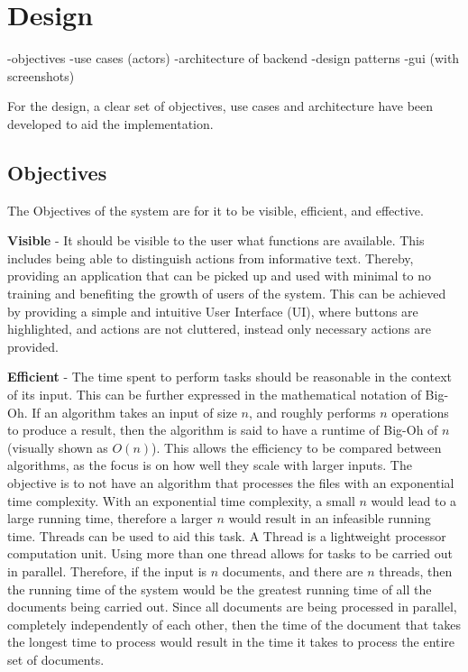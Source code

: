 \chapter{Design}
-objectives
-use cases (actors)
-architecture of backend
-design patterns
-gui (with screenshots)
\par For the design, a clear set of objectives, use cases and architecture have been developed to aid the implementation.
\section{Objectives}
\par The Objectives of the system are for it to be visible, efficient, and effective.
\par \textbf{Visible} -  It should be visible to the user what  functions are available. This includes being able to distinguish actions from informative text. Thereby, providing an application that can be picked up and used with minimal to no training and benefiting the growth of users of the system. This can be achieved by providing a simple and intuitive User Interface (UI), where buttons are highlighted, and actions are not cluttered, instead only necessary actions are provided. 

\par \textbf{Efficient} - The time spent to perform tasks should be reasonable in the context of its input. This can be further expressed in the mathematical notation of Big-Oh. If an algorithm takes an input of size $n$, and roughly performs $n$ operations to produce a result, then the algorithm is said to have a runtime of Big-Oh of $n$ (visually shown as $O(n)$). This allows the efficiency to be compared between algorithms, as the focus is on how well they scale with larger inputs. The objective is to not have an algorithm that processes the files with an exponential time complexity. With an exponential time complexity, a small $n$ would lead to a large running time, therefore a larger $n$ would result in an infeasible running time. Threads can be used to aid this task. A Thread is a lightweight processor computation unit. Using more than one thread allows for tasks to be carried out in parallel. Therefore, if the input is $n$ documents, and there are $n$ threads, then the running time of the system would be the greatest running time of all the documents being carried out. Since all documents are being processed in parallel, completely independently of each other, then the time of the document that takes the longest time to process would result in the time it takes to process the entire set of documents.

